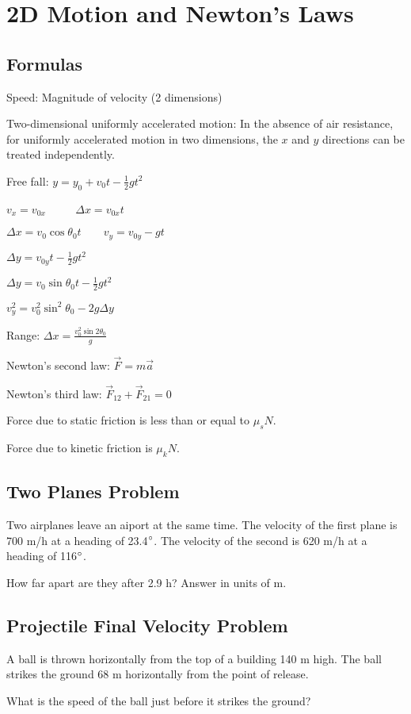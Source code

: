 \documentclass[../physics12.tex]{subfiles}
\begin{document}
\chapter{2D Motion and Newton's Laws}
\section{Formulas}
Speed: Magnitude of velocity (2 dimensions)

Two-dimensional uniformly accelerated motion: In the absence of air resistance, for uniformly accelerated motion in two dimensions, the $x$ and $y$ directions can be treated independently.

Free fall: $y=y_0+v_0t-\frac{1}{2}gt^2$

$v_x=v_{0x}$ $\qquad$ $\Delta x = v_{0x}t$

$\Delta x = v_0 \cos\theta_0 t \qquad v_y = v_{0y}-gt$

$\Delta y = v_{0y}t-\frac{1}{2}gt^2$

$\Delta y = v_0\sin\theta_0 t - \frac{1}{2}gt^2$

$v_y^2 = v_0^2\sin^2\theta_0 - 2g\Delta y$

Range: $\Delta x = \frac{v_0^2\sin2\theta_0}{g}$

Newton's second law: $\vec{F}=m\vec{a}$

Newton's third law: $\vec{F}_{12}+\vec{F}_{21} = 0$

Force due to static friction is less than or equal to $\mu_s N$.

Force due to kinetic friction is $\mu_k N$.

\section{Two Planes Problem}
Two airplanes leave an aiport at the same time. The velocity of the first plane is 700 m/h at a heading of 23.4$\degree$.
The velocity of the second is 620 m/h at a heading of 116$\degree$.

How far apart are they after 2.9 h?
Answer in units of m.

\section{Projectile Final Velocity Problem}
A ball is thrown horizontally from the top of a building 140 m high. The ball strikes the ground 68 m horizontally from the point of release. 

What is the speed of the ball just before it strikes the ground?
\end{document}
